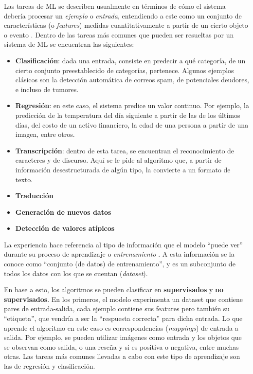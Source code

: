 \documentclass[../../main.tex]{subfiles}
\begin{document}
Las tareas de ML se describen usualmente en términos de cómo el sistema debería procesar un \textit{ejemplo} o \textit{entrada}, entendiendo a este como un conjunto de características (o \textit{features}) medidas cuantitativamente a partir de un cierto objeto o evento \cite{deep-learning}. Dentro de las tareas más comunes que pueden ser resueltas por un sistema de ML se encuentran las siguientes:
\begin{itemize}
    \item \textbf{Clasificación}: dada una entrada, consiste en predecir a qué categoría, de un cierto conjunto preestablecido de categorías, pertenece. Algunos ejemplos clásicos son la detección automática de correos spam, de potenciales deudores, e incluso de tumores.
    \item \textbf{Regresión}: en este caso, el sistema predice un valor continuo. Por ejemplo, la predicción de la temperatura del día siguiente a partir de las de los últimos días, del costo de un activo financiero, la edad de una persona a partir de una imagen, entre otros.
    \item \textbf{Transcripción}: dentro de esta tarea, se encuentran el reconocimiento de caracteres y de discurso. Aquí se le pide al algoritmo que, a partir de información desestructurada de algún tipo, la convierte a un formato de texto.
    \item \textbf{Traducción}
    \item \textbf{Generación de nuevos datos}
    \item \textbf{Detección de valores atípicos}
\end{itemize}

La experiencia hace referencia al tipo de información que el modelo ``puede ver'' durante su proceso de aprendizaje o \textit{entrenamiento} \cite{hands-on-ML-sklearn-tf}. A esta información se la conoce como ``conjunto (de datos) de entrenamiento'', y es un subconjunto de todos los datos con los que se cuentan (\textit{dataset}).

En base a esto, los algoritmos se pueden clasificar en \textbf{supervisados} y \textbf{no supervisados}. En los primeros, el modelo experimenta un dataset que contiene pares de entrada-salida, cada ejemplo contiene sus features pero también su ``etiqueta'', que vendría a ser la ``respuesta correcta'' para dicha entrada. Lo que aprende el algoritmo en este caso es correspondencias (\textit{mappings}) de entrada a salida. Por ejemplo, se pueden utilizar imágenes como entrada y los objetos que se observan como salida, o una reseña y si es positiva o negativa, entre muchas otras. Las tareas más comunes llevadas a cabo con este tipo de aprendizaje son las de regresión y clasificación.
\end{document}
